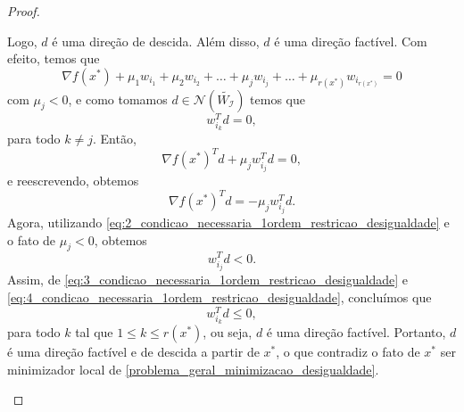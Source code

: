 \documentclass[12pt,a4paper]{scrartcl}
\DeclareMathOperator{\posto}{posto}
\def\RR{\mathds{R}}
\newtheorem{teo}{Teorema}
\theoremstyle{definition}%
\begin{document}
\begin{proof}
\begin{enumerate}
Logo, $d$ é uma direção de descida. Além disso, $d$ é uma direção factível. Com efeito, temos que
\[
\nabla f(x^{*}) + \mu_{1} w_{i_{1}} + \mu_{2} w_{i_{2}} + \ldots + \mu_{j} w_{i_{j}} + \ldots + \mu_{r(x^{*})} w_{i_{r(x^{*})}} =0
\]
com $\mu_{j} <0$, e como tomamos $d \in \mathcal{N}(\tilde{W_{\mathcal{I}}})$ temos que
\[ \label{eq:3_condicao_necessaria_1ordem_restricao_desigualdade}
w_{i_{k}}^{T}d =0, 
\]
para todo $k \neq j$. Então,
\[
\nabla f(x^{*})^{T}d + \mu_{j} w_{i_{j}}^{T} d =0,
\]
e reescrevendo, obtemos
\[
\nabla f(x^{*})^{T}d = -\mu_{j} w_{i_{j}}^{T} d.
\]
Agora, utilizando \eqref{eq:2_condicao_necessaria_1ordem_restricao_desigualdade} e o fato de $\mu_{j} <0$, obtemos
\[ \label{eq:4_condicao_necessaria_1ordem_restricao_desigualdade}
w_{i_{j}}^{T} d <0.
\]
Assim, de \eqref{eq:3_condicao_necessaria_1ordem_restricao_desigualdade} e \eqref{eq:4_condicao_necessaria_1ordem_restricao_desigualdade}, concluímos que
\[
w_{i_{k}}^{T} d \leq 0,
\]
para todo $k$ tal que $1 \leq k \leq r(x^{*})$, ou seja, $d$ é uma direção factível. Portanto, $d$ é uma direção factível e de descida a partir de $x^{*}$, o que contradiz o fato de $x^{*}$ ser minimizador local de \eqref{problema_geral_minimizacao_desigualdade}.
\end{enumerate}
\end{proof}


\end{document}
